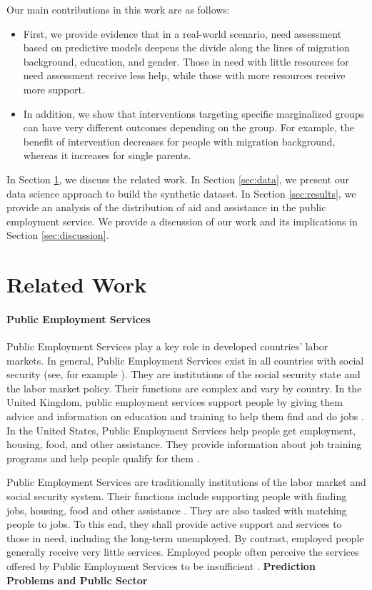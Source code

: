 Our main contributions in this work are as follows:
\begin{itemize}
\item First, we provide evidence that in a real-world scenario, need assessment based on predictive models deepens the divide along the lines of migration background, education, and gender. Those in need with little resources for need assessment receive less help, while those with more resources receive more support.
\item In addition, we show that interventions targeting specific marginalized groups can have very different outcomes depending on the group. For example, the benefit of intervention decreases for people with migration background, whereas it increases for single parents.
\end{itemize}
In Section \ref{sec:relatedwork}, we discuss the related work. In Section \ref{sec:data}, we present our data science approach to build the synthetic dataset. In Section \ref{sec:results}, we provide an analysis of the distribution of aid and assistance in the public employment service. We provide a discussion of our work and its implications in Section \ref{sec:discussion}.





\section{Related Work}

\label{sec:relatedwork}
\paragraph{Public Employment Services}
Public Employment Services play a key role in developed countries' labor markets. In general, Public Employment Services exist in all countries with social security (see, for example \citealp{casualties2017}). They are institutions of the social security state and the labor market policy. Their functions are complex and vary by country. In the United Kingdom, public employment services support people by giving them advice and information on education and training to help them find and do jobs 
\cite{parrott2000labour}. In the United States, Public Employment Services help people get employment, housing, food, and other assistance. They provide information about job training programs and help people qualify for them \cite{little2003history}.

Public Employment Services are traditionally institutions of the labor market and social security system. Their functions include supporting people with finding jobs, housing, food and other assistance \cite{little2003history}. They are also tasked with matching people to jobs. To this end, they shall provide active support and services to those in need, including the long-term unemployed. By contrast, employed people generally receive very little services. Employed people often perceive the services offered by Public Employment Services to be insufficient \cite{struyven2021spses,kortner2023predictive}. 
\textbf{Prediction Problems and Public Sector}

